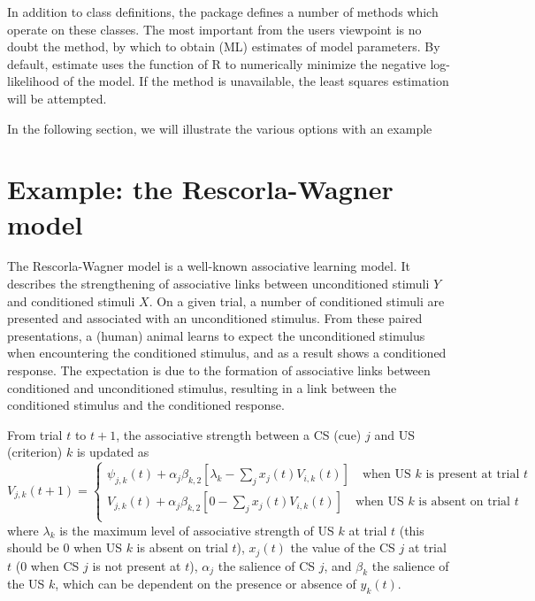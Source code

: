 \documentclass[doc]{apa}
\newcommand{\code}[1]{{\ttfamily{#1}}}
\begin{document}
In addition to class definitions, the \code{mcplR} package defines a number of methods which operate on these classes. The most important from the users viewpoint is no doubt the \code{estimate} method, by which to obtain (ML) estimates of model parameters. By default, estimate uses the \code{optim} function of R to numerically minimize the negative log-likelihood of the model. If the \code{logLik} method is unavailable, the least squares estimation will be attempted.

In the following section, we will illustrate the various options with an example 

\section{Example: the Rescorla-Wagner model}

The Rescorla-Wagner model \cite{Rescorla72} is a well-known associative learning model. It describes the strengthening of associative links between unconditioned stimuli $Y$ and conditioned stimuli $X$. On a given trial, a number of conditioned stimuli are presented and associated with an unconditioned stimulus. From these paired presentations, a (human) animal learns to expect the unconditioned stimulus when encountering the conditioned stimulus, and as a result shows a conditioned response. The expectation is due to the formation of associative links between conditioned and unconditioned stimulus, resulting in a link between the conditioned stimulus and the conditioned response. 

From trial $t$ to $t+1$, the associative strength between a CS (cue) $j$ and US (criterion) $k$ is updated as
\begin{equation}
V_{j,k}(t+1) = \begin{cases} \psi_{j,k}(t) + \alpha_j \beta_{k,2} [\lambda_k - \sum_j x_j(t) V_{i,k}(t)] \quad \text{when US $k$ is present at trial $t$} \\
V_{j,k}(t) + \alpha_j \beta_{k,2} [0 - \sum_j x_j(t) V_{i,k}(t)] \quad \text{when US $k$ is absent on trial $t$} \\
\end{cases}
\end{equation}
where $\lambda_k$ is the maximum level of associative strength of US $k$ at trial $t$ (this should be 0 when US $k$ is absent on trial $t$), $x_j(t)$ the value of the CS $j$ at trial $t$ (0 when CS $j$ is not present at $t$), $\alpha_j$ the salience of CS $j$, and $\beta_k$ the salience of the US $k$, which can be dependent on the presence or absence of $y_k(t)$.
\end{document}
